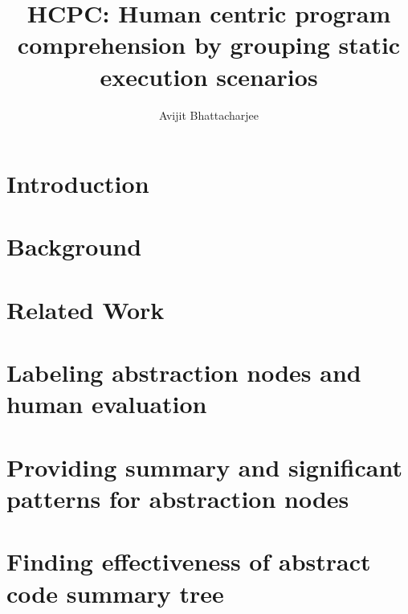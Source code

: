 \documentclass{uofsthesis-cs}
\title{HCPC: Human centric program comprehension by grouping static execution scenarios}
\author{Avijit Bhattacharjee}
\begin{document}
\maketitle

\frontmatter


\chapter{Introduction}




%
% 
% 
%


\chapter{Background}


\chapter{Related Work}


\chapter{ Labeling abstraction nodes and human evaluation}


\chapter{ Providing summary and significant patterns for abstraction nodes}


\chapter{Finding effectiveness of abstract code summary tree}

\end{document}
